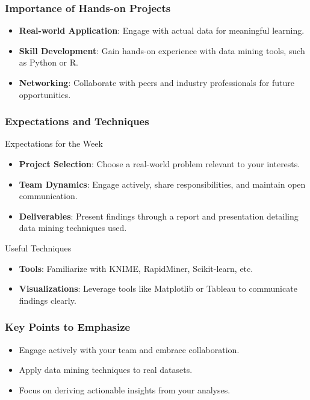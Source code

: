 \documentclass{beamer}
\begin{document}
\begin{frame}[fragile]
    \frametitle{Importance of Hands-on Projects}
    \begin{itemize}
        \item \textbf{Real-world Application}: Engage with actual data for meaningful learning.
        \item \textbf{Skill Development}: Gain hands-on experience with data mining tools, such as Python or R.
        \item \textbf{Networking}: Collaborate with peers and industry professionals for future opportunities.
    \end{itemize}
\end{frame}

\begin{frame}[fragile]
    \frametitle{Expectations and Techniques}
    \begin{block}{Expectations for the Week}
        \begin{itemize}
            \item \textbf{Project Selection}: Choose a real-world problem relevant to your interests.
            \item \textbf{Team Dynamics}: Engage actively, share responsibilities, and maintain open communication.
            \item \textbf{Deliverables}: Present findings through a report and presentation detailing data mining techniques used.
        \end{itemize}
    \end{block}

    \begin{block}{Useful Techniques}
        \begin{itemize}
            \item \textbf{Tools}: Familiarize with KNIME, RapidMiner, Scikit-learn, etc.
            \item \textbf{Visualizations}: Leverage tools like Matplotlib or Tableau to communicate findings clearly.
        \end{itemize}
    \end{block}
\end{frame}

\begin{frame}[fragile]
    \frametitle{Key Points to Emphasize}
    \begin{itemize}
        \item Engage actively with your team and embrace collaboration.
        \item Apply data mining techniques to real datasets.
        \item Focus on deriving actionable insights from your analyses.
    \end{itemize}
\end{frame}
\end{document}
